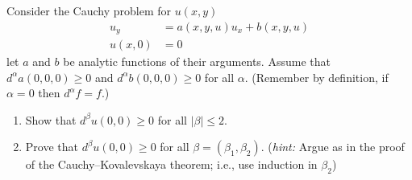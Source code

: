 \begin{problem}
  Consider the Cauchy problem for \(u(x,y)\)
  \begin{align*}
    u_y&=a(x, y, u)u_x+b(x,y,u)\\
    u(x,0)&=0
  \end{align*}
  let \(a\) and \(b\) be analytic functions of their arguments. Assume that
  \(d^\alpha a(0,0,0)\geq 0\) and \(d^\alpha b(0,0,0)\geq 0\) for all
  \(\alpha\). (Remember by definition, if \(\alpha=0\) then
  \(d^\alpha f=f\).)
  \begin{enumerate}[label=(\alph*),noitemsep]
  \item Show that \(d^\beta u(0,0)\geq 0\) for all \(|\beta|\leq 2\).
  \item Prove that \(d^\beta u(0,0)\geq 0\) for all
    \(\beta=(\beta_1,\beta_2)\). (\emph{hint:} Argue as in the proof of the
    Cauchy--Kovalevskaya theorem; i.e., use induction in \(\beta_2\))
  \end{enumerate}
\end{problem}
